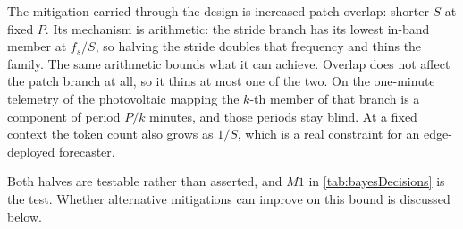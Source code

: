 The mitigation carried through the design is increased patch overlap: shorter $S$ at fixed $P$. Its mechanism is arithmetic: the stride branch has its lowest in-band member at $f_s/S$, so halving the stride doubles that frequency and thins the family. The same arithmetic bounds what it can achieve. Overlap does not affect the patch branch at all, so it thins at most one of the two. On the one-minute telemetry of the photovoltaic mapping the $k$-th member of that branch is a component of period $P/k$ minutes, and those periods stay blind. At a fixed context the token count also grows as $1/S$, which is a real constraint for an edge-deployed forecaster.

Both halves are testable rather than asserted, and $M1$ in \autoref{tab:bayesDecisions} is the test. Whether alternative mitigations can improve on this bound is discussed below.
